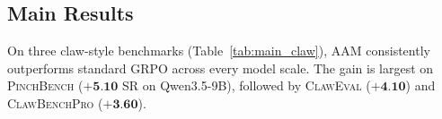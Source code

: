 \documentclass[letterpaper]{article} %
\begin{document}
\subsection{Main Results}
\label{subsec:main_results}
On three claw-style benchmarks (Table~\ref{tab:main_claw}), AAM consistently outperforms standard GRPO across every model scale.
The gain is largest on \textsc{PinchBench} ($+\textbf{5.10}$ SR on Qwen3.5-9B), followed by \textsc{ClawEval} ($+\textbf{4.10}$) and \textsc{ClawBenchPro} ($+\textbf{3.60}$).
\end{document}
